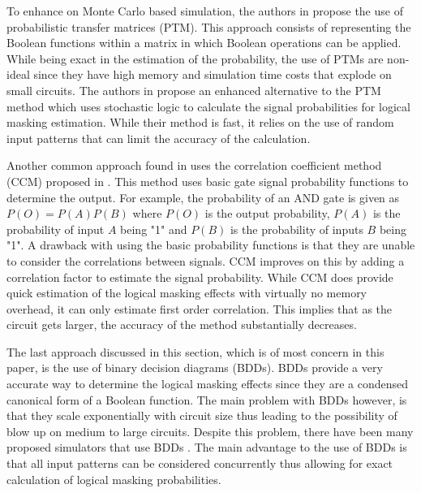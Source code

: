 To enhance on Monte Carlo based simulation, the authors in \cite{PTM} propose the use of probabilistic transfer matrices (PTM). This approach consists of representing the Boolean functions within a matrix in which Boolean operations can be applied. While being exact in the estimation of the probability, the use of PTMs are non-ideal since they have high memory and simulation time costs that explode on small circuits. The authors in \cite{Han2014} propose an enhanced alternative to the PTM method which uses stochastic logic to calculate the signal probabilities for logical masking estimation. While their method is fast, it relies on the use of random input patterns that can limit the accuracy of the calculation.

Another common approach found in \cite{Chen2013,Li2016} uses the correlation coefficient method (CCM) proposed in \cite{Ercolani1989}. This method uses basic gate signal probability functions to determine the output. For example, the probability of an AND gate is given as $P(O) = P(A)P(B)$ where $P(O)$ is the output probability, $P(A)$ is the probability of input $A$ being "1" and $P(B)$ is the probability of inputs $B$ being "1". A drawback with using the basic probability functions is that they are unable to consider the correlations between signals. CCM improves on this by adding a correlation factor to estimate the signal probability. While CCM does provide quick estimation of the logical masking effects with virtually no memory overhead, it can only estimate first order correlation. This implies that as the circuit gets larger, the accuracy of the method substantially decreases.

The last approach discussed in this section, which is of most concern in this paper, is the use of binary decision diagrams (BDDs). BDDs provide a very accurate way to determine the logical masking effects since they are a condensed canonical form of a Boolean function. The main problem with BDDs however, is that they scale exponentially with circuit size thus leading to the possibility of blow up on medium to large circuits. Despite this problem, there have been many proposed simulators that use BDDs \cite{FASER,MARS_C,METSys}. The main advantage to the use of BDDs is that all input patterns can be considered concurrently thus allowing for exact calculation of logical masking probabilities.

